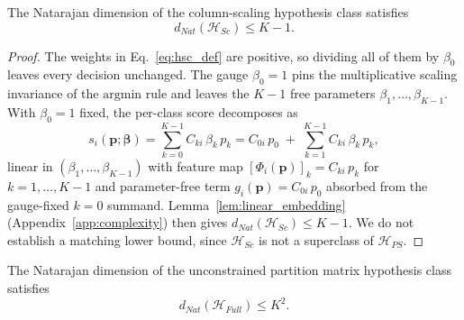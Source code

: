 \begin{theorem}\label{thm:sc_complexity}
    The Natarajan dimension of the column-scaling hypothesis class satisfies
    \begin{equation}
        d_{Nat}(\mathcal{H}_{Sc}) \leq K - 1.
    \end{equation}
\end{theorem}

\begin{proof}
    The weights in Eq.~\eqref{eq:hsc_def} are positive, so dividing all of them by $\beta_0$ leaves every decision unchanged. The gauge $\beta_0 = 1$ pins the multiplicative scaling invariance of the $\mathrm{argmin}$ rule and leaves the $K-1$ free parameters $\beta_1, \ldots, \beta_{K-1}$. With $\beta_0 = 1$ fixed, the per-class score decomposes as
    \begin{equation*}
        s_i(\mathbf{p};\boldsymbol{\beta}) = \sum_{k=0}^{K-1} C_{ki}\,\beta_k\,p_k = C_{0i}\,p_0 \;+\; \sum_{k=1}^{K-1} C_{ki}\,\beta_k\,p_k,
    \end{equation*}
    linear in $(\beta_1, \ldots, \beta_{K-1})$ with feature map $[\Phi_i(\mathbf{p})]_k = C_{ki}\,p_k$ for $k = 1, \ldots, K-1$ and parameter-free term $g_i(\mathbf{p}) = C_{0i}\,p_0$ absorbed from the gauge-fixed $k=0$ summand. Lemma~\ref{lem:linear_embedding} (Appendix~\ref{app:complexity}) then gives $d_{Nat}(\mathcal{H}_{Sc}) \leq K-1$. We do not establish a matching lower bound, since $\mathcal{H}_{Sc}$ is not a superclass of $\mathcal{H}_{PS}$.
\end{proof}

\begin{theorem}\label{thm:full_complexity}
    The Natarajan dimension of the unconstrained partition matrix hypothesis class satisfies
    \begin{equation}
        d_{Nat}(\mathcal{H}_{Full}) \leq K^2.
    \end{equation}
\end{theorem}


